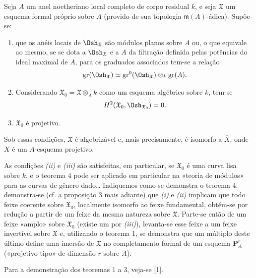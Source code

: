  Seja $A$ um anel noetheriano local completo de corpo
residual $k$, e seja $\mathfrak X$ um esquema formal próprio sobre $A$ (provido
de sua topologia $\mathfrak m(A)$-ádica). Supõe-se:
\begin{enumerate}
  \item[\textit{i.}] que os anéis locais de $\Osh_{\mathfrak X}$ são
    módulos planos sobre $A$ ou, o que equivale ao mesmo, se se dota a
    $\Osh_{\mathfrak X}$ e a $A$ da filtração definida pelas potências do
    ideal maximal de $A$, para os graduados associados tem-se a relação
    \[
      \operatorname{gr}(\Osh_{\mathfrak X})
      \simeq
      \operatorname{gr}^{0}(\Osh_{\mathfrak X})
      \otimes_k\operatorname{gr}(A).
    \]
  \item[\textit{ii.}] Considerando
    $\mathfrak X_0=\mathfrak X\otimes_A k$ como um esquema algébrico sobre
    $k$, tem-se
    \[
      H^2(\mathfrak X_0,\Osh_{\mathfrak X_0})=0.
    \]
  \item[\textit{iii.}] $\mathfrak X_0$ é projetivo.
\end{enumerate}
Sob essas condições, $\mathfrak X$ é algebrizável e, mais precisamente, é
isomorfo a $\overline X$, onde $X$ é um $A$-esquema projetivo.

As condições \textit{(ii)} e \textit{(iii)} são satisfeitas, em particular,
se $\mathfrak X_0$ é uma curva lisa sobre $k$, e o teorema 4 pode ser aplicado
em particular na «teoria de módulos» para as curvas de gênero dado\ldots{}
Indiquemos como se demonstra o teorema 4: demonstra-se (cf. a proposição 3
mais adiante) que \textit{(i)} e \textit{(ii)} implicam que todo feixe coerente
sobre $\mathfrak X_0$, localmente isomorfo ao feixe fundamental, obtém-se por
redução a partir de um feixe da mesma natureza sobre $\mathfrak X$. Parte-se
então de um feixe «amplo» sobre $\mathfrak X_0$ (existe um por
\textit{(iii)}), levanta-se esse feixe a um feixe invertível sobre $\mathfrak X$ e,
utilizando o teorema 1, se demonstra que um múltiplo deste último define uma
imersão de $\mathfrak X$ no completamento formal de um esquema
$\mathbf P_A^r$ («projetivo tipo» de dimensão $r$ sobre $A$).

Para a demonstração dos teoremas 1 a 3, veja-se [1].


